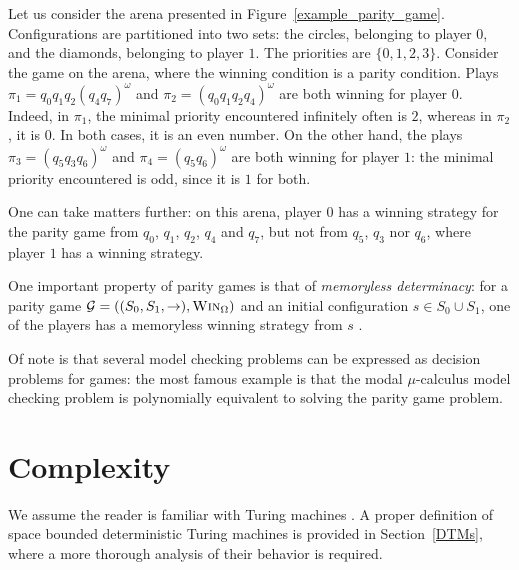 \begin{example}
Let us consider the arena presented in  Figure~\ref{example_parity_game}. 
Configurations are partitioned into two sets: the circles, belonging to player $0$, and the diamonds,
belonging to player $1$. 
The priorities are $\{ 0,1,2,3\}$.
Consider the game on the arena, where the winning condition is a parity condition.
Plays $\pi_1 = q_0 q_1 q_2 (q_4 q_7)^\omega$ and 
$\pi_2 = (q_0 q_1 q_2 q_4)^\omega$ are both winning for player $0$. Indeed, in $\pi_1$, 
the minimal priority encountered infinitely often is %
				$2$, 
whereas in $\pi_2$, it is %
			$0$. 
In both cases, it is an even number. On the other hand,
the plays $\pi_3 = (q_5 q_3 q_6)^\omega$ and $\pi_4=(q_5 q_6)^\omega$ are both winning for player $1$: the minimal priority encountered is odd, since it is $1$ for both.

One can take matters further: on this arena, player $0$ has a winning strategy for the parity game from $q_0$, $q_1$, $q_2$, $q_4$ and $q_7$, but not from $q_5$, $q_3$ nor $q_6$, where player $1$ has a winning strategy. 
\end{example}



One important property of parity games is that of {\em memoryless determinacy}: for a parity game
$\mathcal{G}= ((S_0,S_1,\rightarrow),\textsc{Win}_\Omega) $ and an initial configuration $s \in S_0 \cup S_1$, one of the players has a memoryless winning strategy from $s$ \cite{zielonka1998infinite}.

Of note is that several model checking problems %
can be expressed as decision problems for games: the most famous example is that the modal $\mu$-calculus model checking problem is polynomially equivalent to solving the parity game problem. 



\section{Complexity}

We assume the reader is familiar with 
Turing machines%
.
A proper definition of space bounded deterministic Turing machines is provided in 
Section~\ref{DTMs}, 
where a more thorough analysis of their behavior is required.



